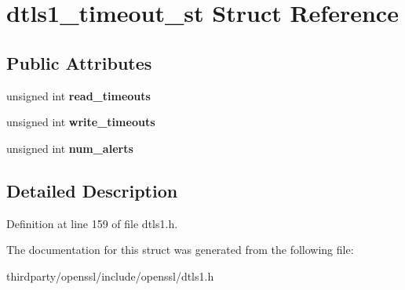 \hypertarget{structdtls1__timeout__st}{}\section{dtls1\+\_\+timeout\+\_\+st Struct Reference}
\label{structdtls1__timeout__st}
\subsection*{Public Attributes}
\begin{DoxyCompactItemize}
\item 
\mbox{\label{structdtls1__timeout__st_a6ea960c7ff443be84029bb3252c6e144}} 
unsigned int {\bfseries read\+\_\+timeouts}
\item 
\mbox{\label{structdtls1__timeout__st_af3fb942d16bbbdf73e6151d7e4e6113b}} 
unsigned int {\bfseries write\+\_\+timeouts}
\item 
\mbox{\label{structdtls1__timeout__st_ab525be86e71d151a15e58e877d1dcd4e}} 
unsigned int {\bfseries num\+\_\+alerts}
\end{DoxyCompactItemize}


\subsection{Detailed Description}


Definition at line 159 of file dtls1.\+h.



The documentation for this struct was generated from the following file\+:\begin{DoxyCompactItemize}
\item 
thirdparty/openssl/include/openssl/dtls1.\+h\end{DoxyCompactItemize}
